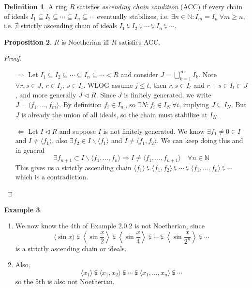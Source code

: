\documentclass[a4paper]{article}
\theoremstyle{definition}
\newtheorem{defn}{Definition}[subsection]
\newtheorem{prop}[defn]{Proposition}
\newtheorem{example}[defn]{Example}
\begin{document}
\begin{defn}
A ring $R$ satisfies \textit{ascending chain condition} (ACC) if every chain of ideals $I_1\subseteq I_2\subseteq \cdots \subseteq I_n\subseteq \cdots$ eventually stabilizes, i.e. $\exists n\in\mathbb N:I_m=I_n \ \forall m\geq n$, i.e. $\nexists$ strictly ascending chain of ideals $I_1\subsetneqq I_2\subsetneqq \cdots \subsetneqq I_n \subsetneqq \cdots$.
\end{defn}
\begin{prop}
$R$ is Noetherian iff $R$ satisfies ACC.
\end{prop}
\begin{proof}
\begin{itemize}
\item[$\Rightarrow$] Let $I_1\subseteq I_2\subseteq \cdots \subseteq I_n\subseteq \cdots \lhd R$ and consider $J=\bigcup_{k=1}^\infty I_k$. Note $\forall r,s\in J,\ r\in I_j,\ s\in I_t$. WLOG assume $j\leq t$, then $r,s\in I_t$ and $r\pm s\in I_t\subset J$, and more generally $J\lhd R$. Since $J$ is finitely generated, we write $J=\langle f_1,\ldots,f_m\rangle$. By definition $f_i\in I_{n_i}$, so $\exists N:f_i\in I_N \ \forall i$, implying $J\subseteq I_N$. But $J$ is already the union of all ideals, so the chain must stabilize at $I_N$.

\item[$\Leftarrow$] Let $I\lhd R$ and suppose $I$ is not finitely generated. We know $\exists f_1\neq 0\in I$ and $I\neq \langle f_1\rangle$, also $\exists f_2\in I\backslash \langle f_1\rangle$ and $I\neq \langle f_1,f_2\rangle$. We can keep doing this and in general
\[
\exists f_{n+1}\subset I\backslash \langle f_1,\ldots,f_n\rangle \Rightarrow I\neq \langle f_1,\ldots,f_{n+1}\rangle \quad \forall n\in \mathbb N
\]
This gives us a strictly ascending chain $\langle f_1\rangle \subsetneqq \langle f_1,f_2\rangle \subsetneqq \cdots \subsetneqq \langle f_1,\ldots,f_n\rangle \subsetneqq \cdots$ which is a contradiction.
\end{itemize}
\end{proof}
\begin{example}
\begin{enumerate}
\item We now know the 4th of Example 2.0.2 is not Noetherian, since
\[
\langle \sin x\rangle \subsetneqq \left\langle \sin \frac{x}{2}\right\rangle \subsetneqq \left\langle \sin \frac{x}{4}\right\rangle \subsetneqq \cdots \subsetneqq \left\langle \sin \frac{x}{2^n}\right\rangle \subsetneqq \cdots
\]
is a strictly ascending chain or ideals.
\item Also,
\[
\langle x_1\rangle \subsetneqq \langle x_1,x_2\rangle \subsetneqq \cdots\subsetneqq \langle x_1,\ldots,x_n\rangle \subsetneqq \cdots
\]
so the 5th is also not Noetherian.
\end{enumerate}
\end{example}
\end{document}
